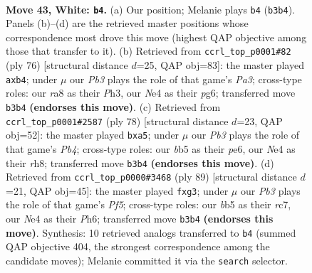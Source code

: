 \documentclass[11pt]{article}
\begin{document}
\clearpage

\begin{figure}[p]\centering
\begin{subfigure}{0.46\textwidth}\centering
\resizebox{\linewidth}{!}{%
\newchessgame
\chessboard[
  setfen={r7/4k3/8/1b2p3/p3N3/RP4P1/6K1/8 w - - 0 43},
  showmover=false,
  pgfstyle=straightmove, color=movearrow, markmove={b3-b4}
]}
\caption{}
\end{subfigure}\hfill
\begin{subfigure}{0.46\textwidth}\centering
\resizebox{\linewidth}{!}{%
\newchessgame
\chessboard[
  setfen={8/3r1k1p/6p1/8/Rp6/P6P/5PK1/8 w - - 0 39},
  showmover=false,
  pgfstyle=straightmove, color=movearrow, markmove={a3-b4}
]}
\caption{}
\end{subfigure}
\\[4pt]
\begin{subfigure}{0.46\textwidth}\centering
\resizebox{\linewidth}{!}{%
\newchessgame
\chessboard[
  setfen={7r/8/3kp3/p5p1/1P4R1/2PK4/7P/8 w - - 0 40},
  showmover=false,
  pgfstyle=straightmove, color=movearrow, markmove={b4-a5}
]}
\caption{}
\end{subfigure}\hfill
\begin{subfigure}{0.46\textwidth}\centering
\resizebox{\linewidth}{!}{%
\newchessgame
\chessboard[
  setfen={8/2RP1pk1/7p/8/3r1p2/6P1/7P/6K1 b - - 2 45},
  showmover=false,
  pgfstyle=straightmove, color=movearrow, markmove={f4-g3}
]}
\caption{}
\end{subfigure}
\caption{\textbf{Move 43, White: \texttt{b4}.} (a) Our position; Melanie plays \texttt{b4} (\texttt{b3b4}). Panels (b)--(d) are the retrieved master positions whose correspondence most drove this move (highest QAP objective among those that transfer to it). (b) Retrieved from \texttt{ccrl\_top\_p0001\#82} (ply 76) [structural distance $d$=25, QAP obj=83]: the master played \texttt{axb4}; under $\mu$ our \emph{Pb3} plays the role of that game's \emph{Pa3}; cross-type roles: our \emph{r}a8 as their \emph{P}h3, our \emph{N}e4 as their \emph{p}g6; transferred move \texttt{b3b4} \textbf{(endorses this move)}. (c) Retrieved from \texttt{ccrl\_top\_p0001\#2587} (ply 78) [structural distance $d$=23, QAP obj=52]: the master played \texttt{bxa5}; under $\mu$ our \emph{Pb3} plays the role of that game's \emph{Pb4}; cross-type roles: our \emph{b}b5 as their \emph{p}e6, our \emph{N}e4 as their \emph{r}h8; transferred move \texttt{b3b4} \textbf{(endorses this move)}. (d) Retrieved from \texttt{ccrl\_top\_p0000\#3468} (ply 89) [structural distance $d$=21, QAP obj=45]: the master played \texttt{fxg3}; under $\mu$ our \emph{Pb3} plays the role of that game's \emph{Pf5}; cross-type roles: our \emph{b}b5 as their \emph{r}c7, our \emph{N}e4 as their \emph{P}h6; transferred move \texttt{b3b4} \textbf{(endorses this move)}. Synthesis: 10 retrieved analogs transferred to \texttt{b4} (summed QAP objective 404, the strongest correspondence among the candidate moves); Melanie committed it via the \texttt{search} selector.}
\label{fig:thought-m84}
\end{figure}
\end{document}
